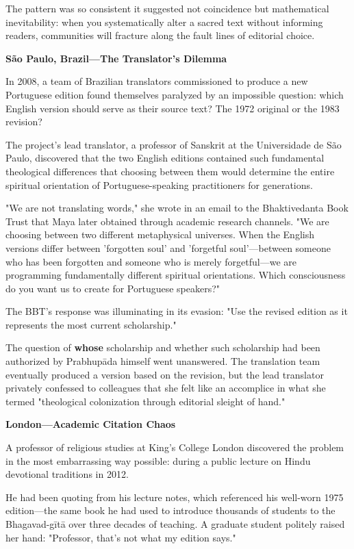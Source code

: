 \documentclass[12pt,twoside]{book}
\begin{document}
The pattern was so consistent it suggested not coincidence but mathematical inevitability: when you systematically alter a sacred text without informing readers, communities will fracture along the fault lines of editorial choice.

\textbf{\textbf{São Paulo, Brazil—The Translator's Dilemma}}

In 2008, a team of Brazilian translators commissioned to produce a new Portuguese edition found themselves paralyzed by an impossible question: which English version should serve as their source text? The 1972 original or the 1983 revision?

The project's lead translator, a professor of Sanskrit at the Universidade de São Paulo, discovered that the two English editions contained such fundamental theological differences that choosing between them would determine the entire spiritual orientation of Portuguese-speaking practitioners for generations.

"We are not translating words," she wrote in an email to the Bhaktivedanta Book Trust that Maya later obtained through academic research channels. "We are choosing between two different metaphysical universes. When the English versions differ between 'forgotten soul' and 'forgetful soul'—between someone who has been forgotten and someone who is merely forgetful—we are programming fundamentally different spiritual orientations. Which consciousness do you want us to create for Portuguese speakers?"

The BBT's response was illuminating in its evasion: "Use the revised edition as it represents the most current scholarship."

The question of \textbf{whose} scholarship and whether such scholarship had been authorized by Prabhupāda himself went unanswered. The translation team eventually produced a version based on the revision, but the lead translator privately confessed to colleagues that she felt like an accomplice in what she termed "theological colonization through editorial sleight of hand."

\textbf{\textbf{London—Academic Citation Chaos}}

A professor of religious studies at King's College London discovered the problem in the most embarrassing way possible: during a public lecture on Hindu devotional traditions in 2012.

He had been quoting from his lecture notes, which referenced his well-worn 1975 edition—the same book he had used to introduce thousands of students to the Bhagavad-gītā over three decades of teaching. A graduate student politely raised her hand: "Professor, that's not what my edition says."
\end{document}
